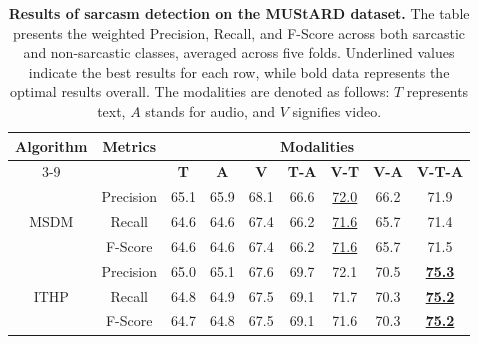 \begin{table}[t]
\setlength\tabcolsep{10.06 pt}
\setlength{\abovecaptionskip}{0.2 cm}
\setlength{\belowcaptionskip}{-.36 cm} 
\setlength\tabcolsep{1.16 em}
\centering
\begin{tabular}{@{}ccccccccc@{}}
    \toprule\toprule
    \multirow{2}{*}{\textbf{Algorithm}} & \multirow{2}{*}{\textbf{Metrics}} &  \multicolumn{7}{c}{\textbf{Modalities}} \\ 
    \cmidrule(lr){3-9} 
    & & \textbf{T}  & \textbf{A}   & \textbf{V} & \textbf{T-A} & \textbf{V-T} & \textbf{V-A} & \textbf{V-T-A} \\ 
    \midrule
    \multirow{3}{*}{MSDM}   & Precision & 65.1 & 65.9 & 68.1 & 66.6 & \uline{72.0} & 66.2 & 71.9 \\ 
                            & Recall    & 64.6 & 64.6 & 67.4 & 66.2 & \uline{71.6} & 65.7 & 71.4 \\ 
                            & F-Score   & 64.6 & 64.6 & 67.4 & 66.2 & \uline{71.6} & 65.7 & 71.5 \\ 
    \midrule
    \multirow{3}{*}{ITHP}   & Precision & 65.0 & 65.1 & 67.6 & 69.7 & 72.1 & 70.5 & \uline{\textbf{75.3}} \\ 
                            & Recall    & 64.8 & 64.9 & 67.5 & 69.1 & 71.7 & 70.3 & \uline{\textbf{75.2}} \\ 
                            & F-Score   & 64.7 & 64.8 & 67.5 & 69.1 & 71.6 & 70.3 & \uline{\textbf{75.2}} \\
    \bottomrule\bottomrule
\end{tabular}
\caption{\textbf{Results of sarcasm detection on the MUStARD dataset.} The table presents the weighted Precision, Recall, and F-Score across both sarcastic and non-sarcastic classes, averaged across five folds. Underlined values indicate the best results for each row, while bold data represents the optimal results overall. The modalities are denoted as follows: $T$ represents text, $A$ stands for audio, and $V$ signifies video.}
\label{tab:ITH-NNSarcasmDetection}
\end{table}